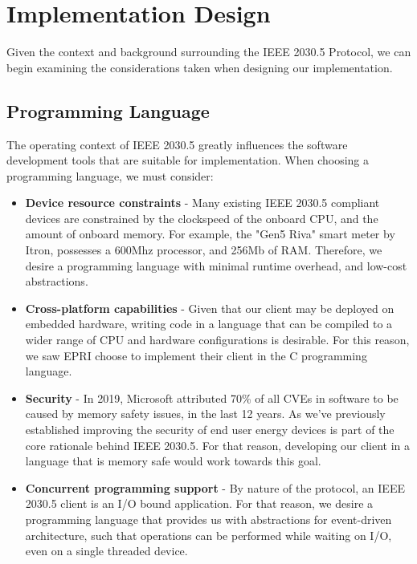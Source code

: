 \chapter{Implementation Design}\label{ch:implementation}
Given the context and background surrounding the IEEE 2030.5 Protocol, we can begin examining the considerations taken when designing our implementation.

\section{Programming Language}
The operating context of IEEE 2030.5 greatly influences the software development tools that are suitable for implementation.
When choosing a programming language, we must consider:

\begin{itemize}
    \item \textbf{Device resource constraints} - Many existing IEEE 2030.5 compliant devices are constrained by the clockspeed of the onboard CPU, and the amount of onboard memory.
    For example, the "Gen5 Riva" smart meter by Itron, possesses a 600Mhz processor, and 256Mb of RAM.\cite[]{Gen5Riva}
    \hfill \break
    Therefore, we desire a programming language with minimal runtime overhead, and low-cost abstractions.
    \item \textbf{Cross-platform capabilities} - Given that our client may be deployed on embedded hardware, writing code in a language that can be compiled to a wider range of CPU and hardware configurations is desirable. 
    For this reason, we saw EPRI choose to implement their client in the C programming language.
    \item \textbf{Security} - In 2019, Microsoft attributed 70\% of all CVEs in software to be caused by memory safety issues, in the last 12 years. \cite[]{SecurityMemorySafety}
    As we've previously established improving the security of end user energy devices is part of the core rationale behind IEEE 2030.5. For that reason, developing our client in a language that is memory safe would work towards this goal.
    \item \textbf{Concurrent programming support} - By nature of the protocol, an IEEE 2030.5 client is an I/O bound application. For that reason, we desire a programming language that provides us with abstractions for event-driven architecture, such that operations can be performed while waiting on I/O, even on a single threaded device.
\end{itemize}


